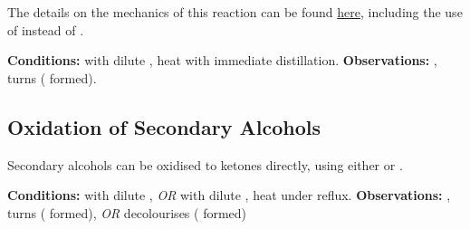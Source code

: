 				The details on the mechanics of this reaction can be found \hyperlink{OxidationOfPrimaryAlcohols}{here}, including
				the use of  instead of .

				\vspace{1.5em}
				\vbox{\textbf{Conditions:}	\tabto{35mm} with dilute ,
											\tabto{35mm}heat with immediate distillation.}
				\vspace{0.75em}
				\vbox{\textbf{Observations:}\tabto{35mm} , turns 
														( formed).}



			\subsection{Oxidation of Secondary Alcohols}

				Secondary alcohols can be oxidised to ketones directly, using either  or .

				\vspace{1.5em}
				\vbox{\textbf{Conditions:}	\tabto{35mm} with dilute , \textit{OR}  with dilute ,
											\tabto{35mm}heat under reflux.}
				\vspace{0.75em}
				\vbox{\textbf{Observations:}\tabto{35mm} , turns 
														( formed), \textit{OR}
											\tabto{35mm}  decolourises ( formed)}




